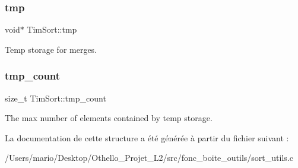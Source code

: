 \subsubsection{\texorpdfstring{tmp}{tmp}}
{\footnotesize\ttfamily void$\ast$ Tim\+Sort\+::tmp}

Temp storage for merges. \mbox{\label{struct_tim_sort_a9a3335f5cebd86067029fac7514c3ebc}} 
\subsubsection{\texorpdfstring{tmp\_count}{tmp\_count}}
{\footnotesize\ttfamily size\+\_\+t Tim\+Sort\+::tmp\+\_\+count}

The max number of elements contained by temp storage. 

La documentation de cette structure a été générée à partir du fichier suivant \+:\begin{DoxyCompactItemize}
\item 
/\+Users/mario/\+Desktop/\+Othello\+\_\+\+Projet\+\_\+\+L2/src/fonc\+\_\+boite\+\_\+outils/sort\+\_\+utils.\+c\end{DoxyCompactItemize}
